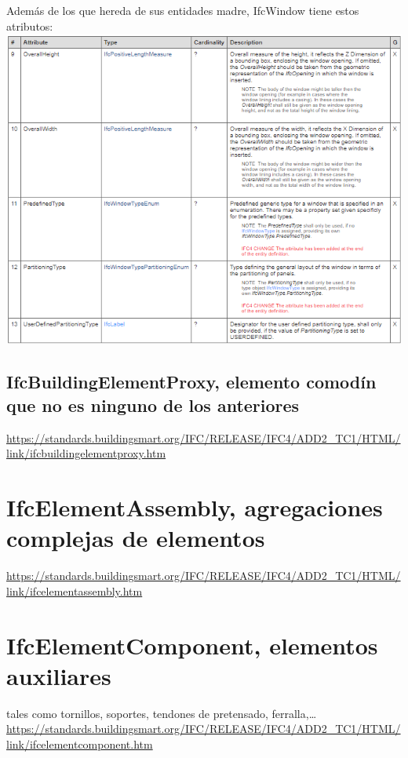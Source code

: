 \documentclass[spanish,12pt,a4paper,final,oneside]{book}
\begin{document}
Además de los que hereda de sus entidades madre, IfcWindow tiene estos atributos:
\\ \includegraphics[width=\textwidth]{atributos de IfcWindow}

\vspace{1cm}
\subsection{IfcBuildingElementProxy, elemento comodín que no es ninguno de los anteriores}
\url{https://standards.buildingsmart.org/IFC/RELEASE/IFC4/ADD2_TC1/HTML/link/ifcbuildingelementproxy.htm}

\vspace{2cm}



\section{IfcElementAssembly, agregaciones complejas de elementos}
\url{https://standards.buildingsmart.org/IFC/RELEASE/IFC4/ADD2_TC1/HTML/link/ifcelementassembly.htm}



\section{IfcElementComponent, elementos auxiliares}
 tales como tornillos, soportes, tendones de pretensado, ferralla,\ldots
\\ \url{https://standards.buildingsmart.org/IFC/RELEASE/IFC4/ADD2_TC1/HTML/link/ifcelementcomponent.htm}
\end{document}
